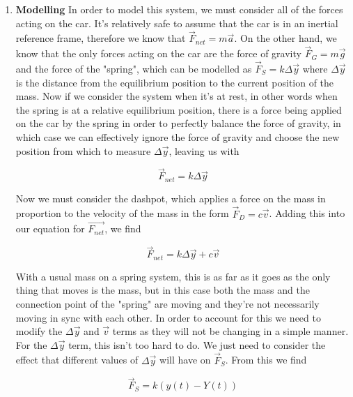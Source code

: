 \documentclass[12pt]{article}
\begin{document}
    \begin{enumerate}
        \item \textbf{Modelling} \newline
        In order to model this system, we must consider all of the forces acting on the car. 
        It's relatively safe to assume that the car is in an inertial reference frame, therefore 
        we know that $\vec{F}_{net}=m\vec{a}$. On the other hand, we know that the only forces 
        acting on the car are the force of gravity $\vec{F}_G = m\vec{g}$ and the force of the 
        "spring", which can be modelled as $\vec{F}_S = k\Delta \vec{y}$ where $\Delta \vec{y}$ 
        is the distance from the equilibrium position to the current position of the mass.
        Now if we consider the system when it's at rest, in other words when the spring is at a 
        relative equilibrium position, there is a force being applied on the car by the spring in 
        order to perfectly balance the force of gravity, in which case we can effectively ignore 
        the force of gravity and choose the new position from which to measure $\Delta \vec{y}$, 
        leaving us with

        \begin{equation*}
            \vec{F}_{net} = k\Delta \vec{y}
        \end{equation*}

        Now we must consider the dashpot, which applies a force on the mass in proportion to 
        the velocity of the mass in the form $\vec{F}_D = c\vec{v}$. Adding this into our 
        equation for $\vec{F_{net}}$, we find 

        \begin{equation*}
            \vec{F}_{net} = k\Delta \vec{y} + c\vec{v}
        \end{equation*}

        With a usual mass on a spring system, this is as far as it goes as the only thing that 
        moves is the mass, but in this case both the mass and the connection point of the 
        "spring" are moving and they're not necessarily moving in sync with each other. In 
        order to account for this we need to modify the $\Delta\vec{y}$ and $\vec{v}$ terms 
        as they will not be changing in a simple manner. For the $\Delta\vec{y}$ term, this 
        isn't too hard to do. We just need to consider the effect that different values of 
        $\Delta\vec{y}$ will have on $\vec{F}_S$. From this we find 

        \begin{equation*}
            \vec{F}_S = k(y(t) - Y(t))
        \end{equation*}


\end{enumerate}
\end{document}
